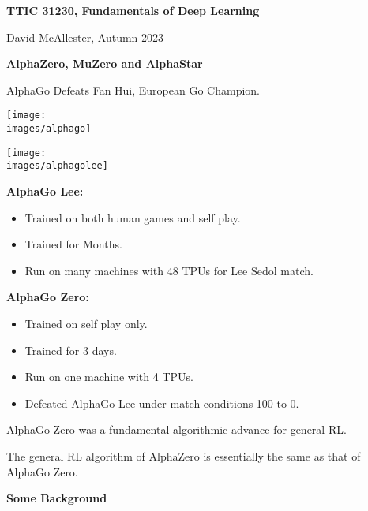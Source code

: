 




{\Huge

  \centerline{\bf TTIC 31230, Fundamentals of Deep Learning}
  \bigskip
  \centerline{David McAllester, Autumn 2023}


  \vfill
  \centerline{\bf AlphaZero, MuZero and AlphaStar}
  \vfill
  \vfill          


AlphaGo Defeats Fan Hui, European Go Champion.

\vfill
\centerline{\texttt{[image: \\images/alphago]}}


\vfill
\centerline{\texttt{[image: \\images/alphagolee]}}


{\bf AlphaGo Lee:}

\begin{itemize}
\item Trained on both human games and self play.
  
\item Trained for Months.

\item Run on many machines with 48 TPUs for Lee Sedol match.
\end{itemize}

{\bf AlphaGo Zero:}
\begin{itemize}
\item Trained on self play only.
  
\item Trained for 3 days.

\item Run on one machine with 4 TPUs.

\item Defeated AlphaGo Lee under match conditions 100 to 0.
\end{itemize}


AlphaGo Zero was a fundamental algorithmic advance for general RL.

\vfill
The general RL algorithm of AlphaZero is essentially the same as that of AlphaGo Zero.


\slide{}

\centerline{\bf Some Background}

}
